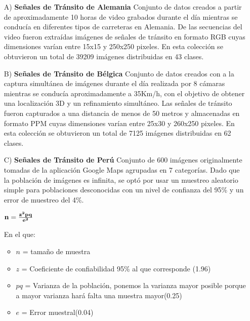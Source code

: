 		\begin{enumerate}
		\item[A)] {\bf Señales de Tránsito de Alemania} \citep{Stallkamp-IJCNN-2011} \newline
			Conjunto de datos creados a partir de aproximadamente 10 horas de video grabados durante el día mientras se conducía en diferentes tipos de carreteras en Alemania. De las secuencias del video fueron extraídas imágenes de señales de tránsito en formato RGB cuyas dimensiones varían entre 15x15 y 250x250 pixeles. En esta colección se obtuvieron un total de 39209 imágenes distribuidas en 43 clases.
		
		\item[B)] {\bf Señales de Tránsito de Bélgica} \citep{Timofte-MVA-2011} \newline
			Conjunto de datos creados con a la captura simultánea de imágenes durante el día realizada por 8 cámaras mientras se conducía aproximadamente a 35Km/h, con el objetivo de obtener una localización 3D y un refinamiento simultáneo. Las señales de tránsito fueron capturados a una distancia de menos de 50 metros y almacenadas en formato PPM cuyas dimensiones varían entre 25x30 y 260x250 pixeles. En esta colección se obtuvieron un total de 7125 imágenes distribuidas en 62 clases.
		
		
		\item[C)] {\bf Señales de Tránsito de Perú} \newline
			Conjunto de 600 imágenes originalmente tomadas de la aplicación Google Maps agrupadas en 7 categorías. Dado que la población de imágenes es infinita, se optó por usar un muestreo aleatorio simple para poblaciones desconocidas con un nivel de confianza del 95\% y un error de muestreo del 4\%.
		
			\vskip 0.4cm
			\begingroup\makeatletter{}\check@mathfonts
			\begin{center}
				${\bf n} ={\bf \frac{z^2pq}{e^2}}$
			\end{center}
			\endgroup
		
			En el que:\vskip 0.1cm
			\begin{itemize}
				\item $n$ = tamaño de muestra
				\item $z$ = Coeficiente de confiabilidad 95\% al que corresponde (1.96)
				\item $pq$ = Varianza de la población, ponemos la varianza mayor posible porque a mayor varianza hará falta una muestra mayor(0.25)
				\item $e$ = Error muestral(0.04)
			\end{itemize}
		\end{enumerate}